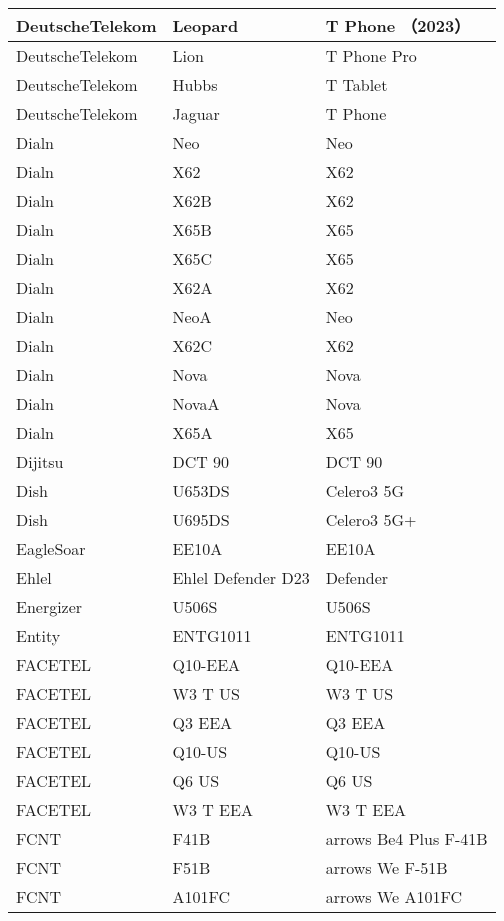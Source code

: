 \begin{tabularx}{\linewidth}{|l|X|X|}
        DeutscheTelekom & Leopard & T Phone （2023） \\ \hline
        DeutscheTelekom & Lion & T Phone Pro \\ \hline
        DeutscheTelekom & Hubbs & T Tablet \\ \hline
        DeutscheTelekom & Jaguar & T Phone \\ \hline
        Dialn & Neo & Neo \\ \hline
        Dialn & X62 & X62 \\ \hline
        Dialn & X62B & X62 \\ \hline
        Dialn & X65B & X65 \\ \hline
        Dialn & X65C & X65 \\ \hline
        Dialn & X62A & X62 \\ \hline
        Dialn & NeoA & Neo \\ \hline
        Dialn & X62C & X62 \\ \hline
        Dialn & Nova & Nova \\ \hline
        Dialn & NovaA & Nova \\ \hline
        Dialn & X65A & X65 \\ \hline
        Dijitsu & DCT 90 & DCT 90 \\ \hline
        Dish & U653DS & Celero3 5G \\ \hline
        Dish & U695DS & Celero3 5G+ \\ \hline
        EagleSoar & EE10A & EE10A \\ \hline
        Ehlel & Ehlel Defender D23 & Defender \\ \hline
        Energizer & U506S & U506S \\ \hline
        Entity & ENTG1011 & ENTG1011 \\ \hline
        FACETEL & Q10-EEA & Q10-EEA \\ \hline
        FACETEL & W3 T US & W3 T US \\ \hline
        FACETEL & Q3 EEA & Q3 EEA \\ \hline
        FACETEL & Q10-US & Q10-US \\ \hline
        FACETEL & Q6 US & Q6 US \\ \hline
        FACETEL & W3 T EEA & W3 T EEA \\ \hline
        FCNT & F41B & arrows Be4 Plus F-41B \\ \hline
        FCNT & F51B & arrows We F-51B \\ \hline
        FCNT & A101FC & arrows We A101FC \\ \hline

\end{tabularx}
